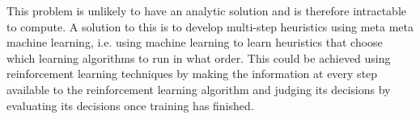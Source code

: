 \documentclass[a4paper,12pt,twoside,openright]{report}
\begin{document}
This problem is unlikely to have an analytic solution and is therefore intractable to compute. A solution to this is to develop multi-step heuristics using meta meta machine learning, i.e. using machine learning to learn heuristics that choose which learning algorithms to run in what order. This could be achieved using reinforcement learning techniques by making the information at every step available to the reinforcement learning algorithm and judging its decisions by evaluating its decisions once training has finished.



\appendix
\singlespacing


 

\end{document}
